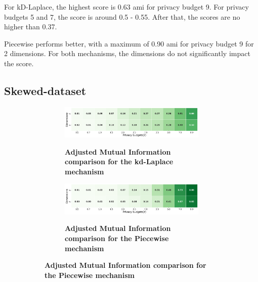 For kD-Laplace, the highest score is 0.63 \gls{ami} for privacy budget 9. For privacy budgets 5 and 7, the score is around 0.5 - 0.55. After that, the scores are no higher than 0.37.

Piecewise performs better, with a maximum of 0.90 \gls{ami} for privacy budget 9 for 2 dimensions. For both mechanisms, the dimensions do not significantly impact the score.
\newpage
\subsection{Skewed-dataset}
\begin{figure}[H]
  \centering
  \begin{subfigure}[b]{0.85\textwidth}
    \begin{subfigure}[c]{1\textwidth}
      \caption{\textbf{Adjusted Mutual Information comparison for the kd-Laplace mechanism}}
      \includegraphics[width=1\textwidth]{Results/kd-laplace/kd-Laplace/skewed-dataset/ami.png}
      \label{fig:ami_skewed-dataset_comparison_kdlaplace_2d}
    \end{subfigure}
    \vfill %
    \begin{subfigure}[c]{1\textwidth}
      \caption{\textbf{Adjusted Mutual Information comparison for the Piecewise mechanism}}
      \includegraphics[width=1\textwidth]{Results/kd-laplace/piecewise/skewed-dataset/ami.png}
      \label{fig:ami_skewed-dataset_comparison_piecewise_2d}
    \end{subfigure}
  \end{subfigure}
  \hfill %
  \begin{subfigure}[b]{0.075\textwidth}

\end{subfigure}
\end{figure}
